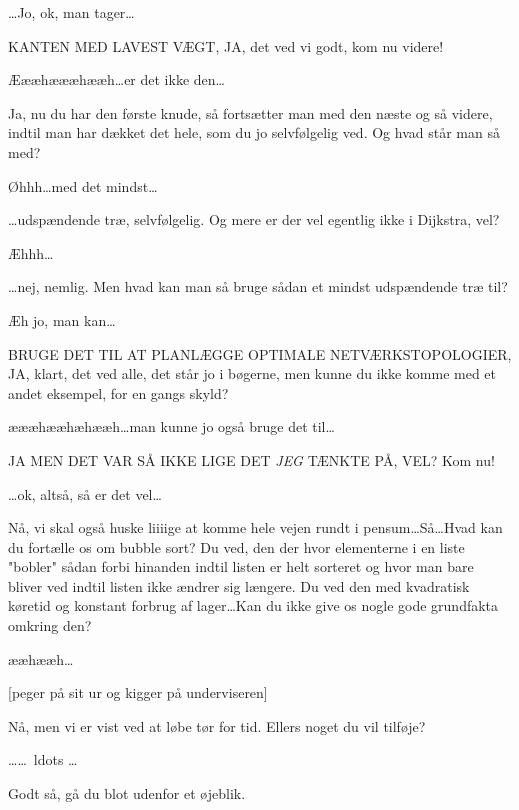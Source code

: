 \documentclass[a4paper,11pt]{article}
\begin{document}
\begin{sketch}
   \ldots Jo, ok, man tager\ldots

   KANTEN MED LAVEST VÆGT, JA, det ved vi godt, kom nu videre!

   Æææhæææhææh\ldots er det ikke den\ldots

   Ja, nu du har den første knude, så fortsætter man med den næste og så
  videre, indtil man har dækket det hele, som du jo selvfølgelig ved. Og hvad
  står man så med?

   Øhhh\ldots med det mindst\ldots

   \ldots udspændende træ, selvfølgelig. Og mere er der vel egentlig ikke
  i Dijkstra, vel?

   Æhhh\ldots

   \ldots nej, nemlig. Men hvad kan man så bruge sådan et mindst
  udspændende træ til?

   Æh jo, man kan\ldots

   BRUGE DET TIL AT PLANLÆGGE OPTIMALE NETVÆRKSTOPOLOGIER, JA, klart, det
  ved alle, det står jo i bøgerne, men kunne du ikke komme med et andet eksempel,
  for en gangs skyld?

   æææhææhæhææh\ldots man kunne jo også bruge det til\ldots

   JA MEN DET VAR SÅ IKKE LIGE DET \emph{JEG} TÆNKTE PÅ, VEL? Kom nu!

   \ldots ok, altså, så er det vel\ldots

   Nå, vi skal også huske liiiige at komme hele vejen rundt i
  pensum\ldots Så\ldots Hvad kan du fortælle os om bubble sort? Du ved, den der
  hvor elementerne i en liste "bobler" sådan forbi hinanden indtil listen er helt
  sorteret og hvor man bare bliver ved indtil listen ikke ændrer sig længere. Du
  ved den med kvadratisk køretid og konstant forbrug af lager\ldots Kan du ikke
  give os nogle gode grundfakta omkring den?

   ææhææh\ldots

  [peger på sit ur og kigger på underviseren]

   Nå, men vi er vist ved at løbe tør for tid. Ellers noget du vil
  tilføje?

   \ldots \ldots\ ldots \ldots

   Godt så, gå du blot udenfor et øjeblik.




\end{sketch}
\end{document}

